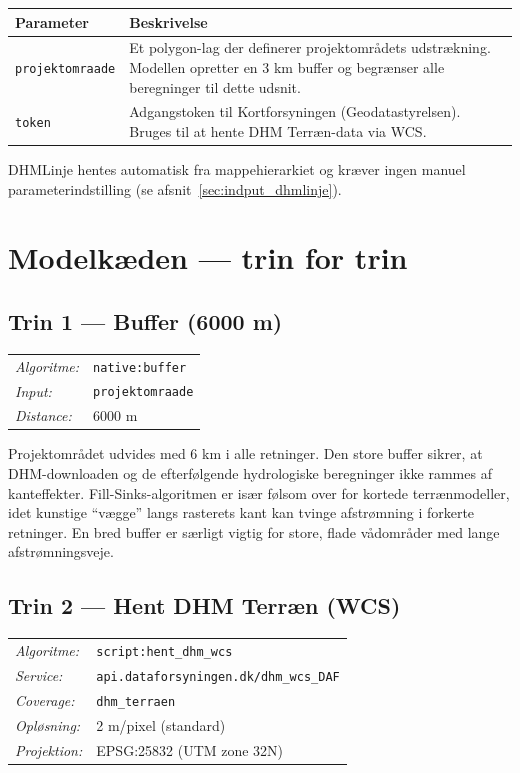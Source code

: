 \begin{tabular}{lp{10cm}}
  \hline
  \textbf{Parameter} & \textbf{Beskrivelse} \\
  \hline
  \texttt{projektomraade} & Et polygon-lag der definerer projektområdets udstrækning.
    Modellen opretter en 3 km buffer og begrænser alle beregninger til dette udsnit. \\[4pt]
  \texttt{token} & Adgangstoken til Kortforsyningen (Geodatastyrelsen).
    Bruges til at hente DHM Terræn-data via WCS. \\
  \hline
\end{tabular}

\medskip
DHMLinje hentes automatisk fra mappehierarkiet og kræver ingen manuel
parameterindstilling (se afsnit~\ref{sec:indput_dhmlinje}).


\section{Modelkæden — trin for trin}

\subsection{Trin 1 — Buffer (6000 m)}

\begin{tabular}{ll}
  \textit{Algoritme:} & \texttt{native:buffer} \\
  \textit{Input:}     & \texttt{projektomraade} \\
  \textit{Distance:}  & 6000 m \\
\end{tabular}

\medskip
Projektområdet udvides med 6 km i alle retninger. Den store buffer sikrer, at
DHM-downloaden og de efterfølgende hydrologiske beregninger ikke rammes af
kanteffekter. Fill-Sinks-algoritmen er især følsom over for kortede
terrænmodeller, idet kunstige ``vægge'' langs rasterets kant kan tvinge
afstrømning i forkerte retninger. En bred buffer er særligt vigtig for
store, flade vådområder med lange afstrømningsveje.

\subsection{Trin 2 — Hent DHM Terræn (WCS)}

\begin{tabular}{ll}
  \textit{Algoritme:}  & \texttt{script:hent\_dhm\_wcs} \\
  \textit{Service:}    & \texttt{api.dataforsyningen.dk/dhm\_wcs\_DAF} \\
  \textit{Coverage:}   & \texttt{dhm\_terraen} \\
  \textit{Opløsning:}  & 2 m/pixel (standard) \\
  \textit{Projektion:} & EPSG:25832 (UTM zone 32N) \\
\end{tabular}

